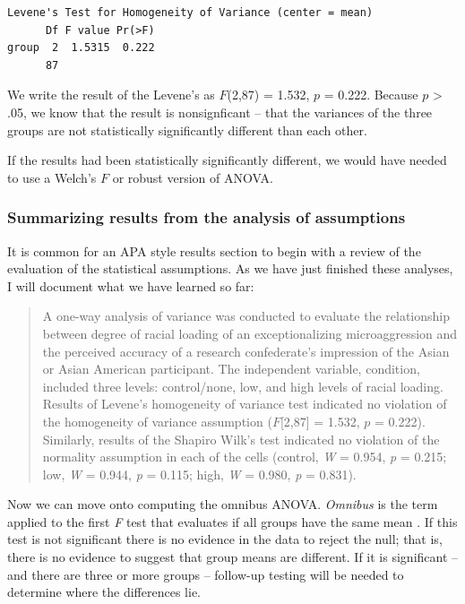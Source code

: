 \documentclass[
  11pt,
]{book}
\begin{document}
\begin{verbatim}
Levene's Test for Homogeneity of Variance (center = mean)
      Df F value Pr(>F)
group  2  1.5315  0.222
      87               
\end{verbatim}

We write the result of the Levene's as \(F\)(2,87) = 1.532, \(p\) = 0.222. Because \(p\) \textgreater{} .05, we know that the result is nonsignficant -- that the variances of the three groups are not statistically significantly different than each other.

If the results had been statistically significantly different, we would have needed to use a Welch's \(F\) or robust version of ANOVA.

\hypertarget{summarizing-results-from-the-analysis-of-assumptions}{%
\subsubsection{Summarizing results from the analysis of assumptions}\label{summarizing-results-from-the-analysis-of-assumptions}}

It is common for an APA style results section to begin with a review of the evaluation of the statistical assumptions. As we have just finished these analyses, I will document what we have learned so far:

\begin{quote}
A one-way analysis of variance was conducted to evaluate the relationship between degree of racial loading of an exceptionalizing microaggression and the perceived accuracy of a research confederate's impression of the Asian or Asian American participant. The independent variable, condition, included three levels: control/none, low, and high levels of racial loading. Results of Levene's homogeneity of variance test indicated no violation of the homogeneity of variance assumption (\(F\){[}2,87{]} = 1.532, \(p\) = 0.222). Similarly, results of the Shapiro Wilk's test indicated no violation of the normality assumption in each of the cells (control, \emph{W} = 0.954, \emph{p} = 0.215; low, \emph{W} = 0.944, \emph{p} = 0.115; high, \emph{W} = 0.980, \emph{p} = 0.831).
\end{quote}

Now we can move onto computing the omnibus ANOVA. \emph{Omnibus} is the term applied to the first \emph{F} test that evaluates if all groups have the same mean \citep{chen_relationship_2018}. If this test is not significant there is no evidence in the data to reject the null; that is, there is no evidence to suggest that group means are different. If it is significant -- and there are three or more groups -- follow-up testing will be needed to determine where the differences lie.
\end{document}
